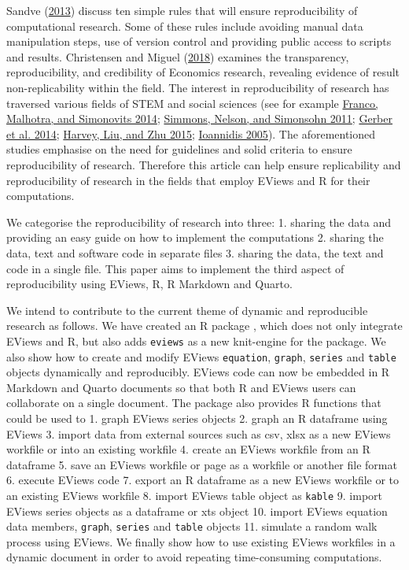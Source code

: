 Sandve (\protect\hyperlink{ref-sandve2013}{2013}) discuss ten simple rules that will ensure reproducibility of computational research. Some of these rules include avoiding manual data manipulation steps, use of version control and providing public access to scripts and results. Christensen and Miguel (\protect\hyperlink{ref-christensen2018}{2018}) examines the transparency, reproducibility, and credibility of Economics research, revealing evidence of result non-replicability within the field. The interest in reproducibility of research has traversed various fields of STEM and social sciences (see for example \protect\hyperlink{ref-franco2014}{Franco, Malhotra, and Simonovits 2014}; \protect\hyperlink{ref-joseph2011}{Simmons, Nelson, and Simonsohn 2011}; \protect\hyperlink{ref-gerber2014}{Gerber et al. 2014}; \protect\hyperlink{ref-harvey2015}{Harvey, Liu, and Zhu 2015}; \protect\hyperlink{ref-ioannidis2005}{Ioannidis 2005}). The aforementioned studies emphasise on the need for guidelines and solid criteria to ensure reproducibility of research. Therefore this article can help ensure replicability and reproducibility of research in the fields that employ EViews and R for their computations.

We categorise the reproducibility of research into three: 1. sharing the data and providing an easy guide on how to implement the computations 2. sharing the data, text and software code in separate files 3. sharing the data, the text and code in a single file. This paper aims to implement the third aspect of reproducibility using EViews, R, R Markdown and Quarto.

We intend to contribute to the current theme of dynamic and reproducible research as follows. We have created an R package , which does not only integrate EViews and R, but also adds \texttt{eviews} as a new knit-engine for the  package. We also show how to create and modify EViews \texttt{equation}, \texttt{graph}, \texttt{series} and \texttt{table} objects dynamically and reproducibly. EViews code can now be embedded in R Markdown and Quarto documents so that both R and EViews users can collaborate on a single document. The package also provides R functions that could be used to 1. graph EViews series objects 2. graph an R dataframe using EViews 3. import data from external sources such as csv, xlsx as a new EViews workfile or into an existing workfile 4. create an EViews workfile from an R dataframe 5. save an EViews workfile or page as a workfile or another file format 6. execute EViews code 7. export an R dataframe as a new EViews workfile or to an existing EViews workfile 8. import EViews table object as \texttt{kable} 9. import EViews series objects as a dataframe or xts object 10. import EViews equation data members, \texttt{graph}, \texttt{series} and \texttt{table} objects 11. simulate a random walk process using EViews. We finally show how to use existing EViews workfiles in a dynamic document in order to avoid repeating time-consuming computations.

